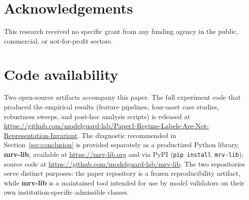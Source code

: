 \documentclass[preprint,12pt,authoryear]{elsarticle}
\begin{document}
\section*{Acknowledgements}

This research received no specific grant from any funding agency in the public, commercial, or not-for-profit sectors.

\section*{Code availability}

Two open-source artifacts accompany this paper. The full experiment code that produced the empirical results (feature pipelines, four-asset case studies, robustness sweeps, and post-hoc analysis scripts) is released at \url{https://github.com/modelguard-lab/Paper1-Regime-Labels-Are-Not-Representation-Invariant}. The diagnostic recommended in Section~\ref{sec:conclusion} is provided separately as a productized Python library, \textbf{mrv-lib}, available at \url{https://mrv-lib.org} and via PyPI (\texttt{pip install mrv-lib}); source code at \url{https://github.com/modelguard-lab/mrv-lib}. The two repositories serve distinct purposes: the paper repository is a frozen reproducibility artifact, while \textbf{mrv-lib} is a maintained tool intended for use by model validators on their own institution-specific admissible classes.


\end{document}
